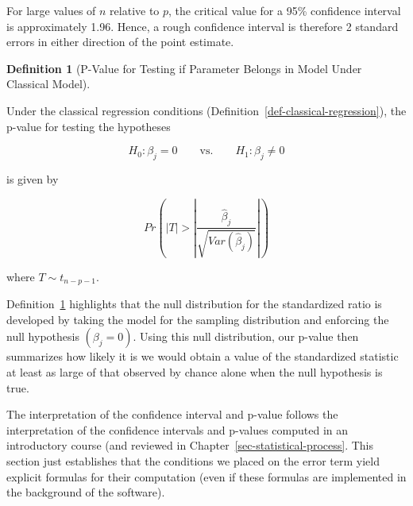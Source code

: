 \documentclass[
  letterpaper,
  DIV=11,
  numbers=noendperiod]{scrreprt}
\theoremstyle{definition}
\newtheorem{definition}{Definition}[chapter]
\theoremstyle{definition}
\theoremstyle{remark}
\begin{document}
\begin{tcolorbox}[enhanced jigsaw, left=2mm, toprule=.15mm, arc=.35mm, breakable, opacitybacktitle=0.6, opacityback=0, rightrule=.15mm, colbacktitle=quarto-callout-note-color!10!white, coltitle=black, leftrule=.75mm, toptitle=1mm, colframe=quarto-callout-note-color-frame, titlerule=0mm, title=\textcolor{quarto-callout-note-color}{\faInfo}\hspace{0.5em}{Note}, bottomrule=.15mm, colback=white, bottomtitle=1mm]

For large values of \(n\) relative to \(p\), the critical value for a
95\% confidence interval is approximately 1.96. Hence, a rough
confidence interval is therefore 2 standard errors in either direction
of the point estimate.

\end{tcolorbox}

\begin{definition}[P-Value for Testing if Parameter Belongs in Model
Under Classical
Model]\protect\hypertarget{def-classical-p}{}\label{def-classical-p}

Under the classical regression conditions
(Definition~\ref{def-classical-regression}), the p-value for testing the
hypotheses

\[H_0: \beta_j = 0 \qquad \text{vs.} \qquad H_1: \beta_j \neq 0\]

is given by

\[Pr\left(\left\lvert T\right\rvert > \left\lvert\frac{\widehat{\beta}_j}{\sqrt{Var\left(\widehat{\beta}_j\right)}}\right\rvert\right)\]

where \(T \sim t_{n-p-1}\).

\end{definition}

Definition~\ref{def-classical-p} highlights that the null distribution
for the standardized ratio is developed by taking the model for the
sampling distribution and enforcing the null hypothesis
\(\left(\beta_j = 0\right)\). Using this null distribution, our p-value
then summarizes how likely it is we would obtain a value of the
standardized statistic at least as large of that observed by chance
alone when the null hypothesis is true.

The interpretation of the confidence interval and p-value follows the
interpretation of the confidence intervals and p-values computed in an
introductory course (and reviewed in
Chapter~\ref{sec-statistical-process}. This section just establishes
that the conditions we placed on the error term yield explicit formulas
for their computation (even if these formulas are implemented in the
background of the software).
\end{document}
